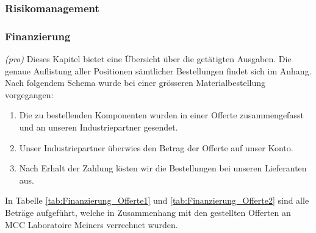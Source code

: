 \subsubsection{Risikomanagement}

\subsubsection{Finanzierung} \label{finanzierung}
\textit{(pro)} Dieses Kapitel bietet eine Übersicht über die getätigten Ausgaben. Die genaue Auflistung aller Positionen sämtlicher Bestellungen findet sich im Anhang. Nach folgendem Schema wurde bei einer grösseren Materialbestellung vorgegangen:

\begin{enumerate}
	\item Die zu bestellenden Komponenten wurden in einer Offerte zusammengefasst und an unseren Industriepartner gesendet.
	\item Unser Industriepartner überwies den Betrag der Offerte auf unser Konto.
	\item Nach Erhalt der Zahlung lösten wir die Bestellungen bei unseren Lieferanten aus.
\end{enumerate}


In Tabelle \ref{tab:Finanzierung_Offerte1} und \ref{tab:Finanzierung_Offerte2} sind alle Beträge aufgeführt, welche in Zusammenhang mit den gestellten Offerten an MCC Laboratoire Meiners verrechnet wurden. 

